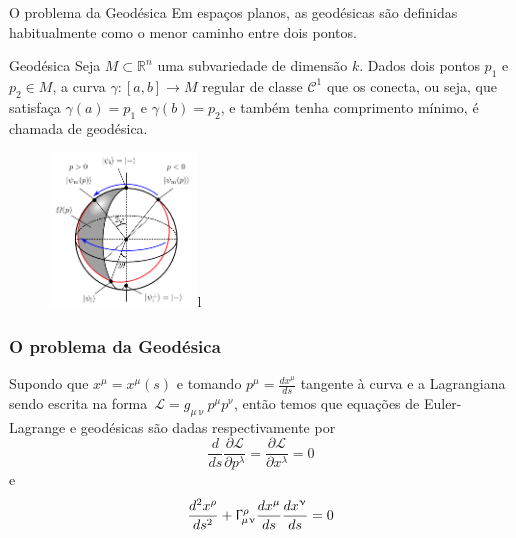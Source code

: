 \documentclass{beamer}
\theoremstyle{plain}
\theoremstyle{definition}
\theoremstyle{definition}
\theoremstyle{definition}
\theoremstyle{definition}
\theoremstyle{definition}
\theoremstyle{definition}
\theoremstyle{definition}
\theoremstyle{definition}
\begin{document}
\begin{frame}{O problema da Geodésica}
    Em espaços planos, as geodésicas são definidas habitualmente como o menor caminho entre dois pontos.
    
    \begin{block}{Geodésica}
    Seja $M \subset \mathbb{R}^n$ uma subvariedade de dimensão $k$. Dados dois pontos $p_1$ e $p_2 \in M$, a curva $\gamma:[a, b] \rightarrow M$ regular de classe $\mathcal{C}^1$ que os conecta, ou seja, que satisfaça $\gamma(a) = p_1$ e $\gamma(b) = p_2$, e também tenha comprimento mínimo, é chamada de geodésica.
    \end{block}
    \begin{figure}[!h]
\begin{center}
\includegraphics[width=0.35\textwidth]{Template_ERMACMS/bloch.png}l
\end{center}
\end{figure}
\end{frame}


\begin{frame}
\frametitle{O problema da Geodésica}

Supondo que $x^\mu = x^\mu(s)$ e tomando $p^\mu = \frac{dx^\mu}{ds}$ tangente à curva e a Lagrangiana sendo escrita na
forma~$\mathcal{L} = g_{\mu \upnu} p^\mu p^\upnu$, então temos que equações de
Euler-Lagrange e geodésicas são dadas respectivamente por
$$
\frac{d}{ds}\frac{\partial \mathcal{L}}{\partial p^\lambda} = \frac{\partial\mathcal{L}}{\partial x^\lambda} = 0
$$
e
$$
\frac{d^2 x^\rho}{ds^2} + \Upgamma^\rho_{\mu \upnu}\frac{dx^\mu}{ds}  \frac{dx^\upnu}{ds} =0
$$
\end{frame}
\end{document}
